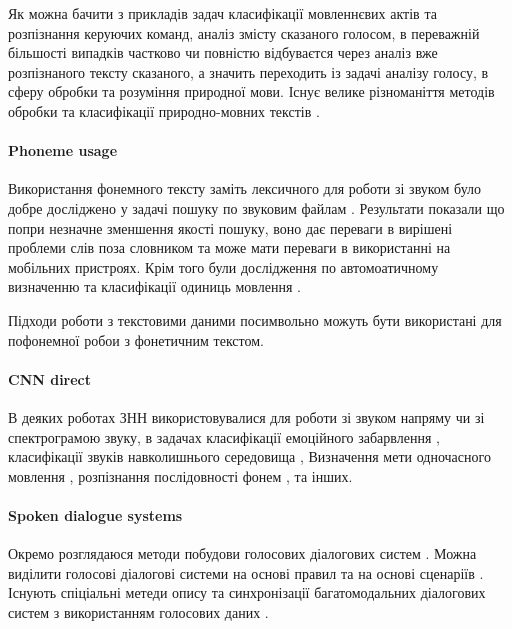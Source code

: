 Як можна бачити з прикладів задач класифікації мовленнєвих актів та розпізнання керуючих команд, аналіз змісту сказаного голосом, в переважній більшості випадків частково чи повністю відбуваєтся через аналіз вже розпізнаного тексту сказаного, а значить переходить із задачі аналізу голосу, в сферу обробки та розуміння природної мови. Існує велике різноманіття методів обробки та класифікації природно-мовних текстів \cite{Mironczuk_2018,Altinel_2018,Hartmann_2018,Kim_2014,Britz_2015_2,Britz_2015,Marchenko_2005}.

\paragraph{Phoneme usage}

Використання фонемного тексту заміть лексичного для роботи зі звуком було добре досліджено у задачі пошуку по звуковим файлам \cite{Ng_C_2000,Ng_K_2000,Witbrock_1997}. Результати показали що попри незначне зменшення якості пошуку, воно дає переваги в вирішені проблеми слів поза словником та може мати переваги в використанні на мобільних пристроях. Крім того були дослідження по автомоатичному визначенню та класифікації одиниць мовлення \cite{Sharma_2018}.

Підходи роботи з текстовими даними посимвольно \cite{Kim_2016,Zhang_2015_2,Zhang_2015,Santos_2014} можуть бути використані для пофонемної робои з фонетичним текстом.

\paragraph{CNN direct}

В деяких роботах ЗНН використовувалися для роботи зі звуком напряму чи зі спектрограмою звуку, в задачах класифікації емоційного забарвлення \cite{Weisskirchen_2017}, класифікації звуків навколишнього середовища \cite{Boddapati_2017}, Визначення мети одночасного мовлення \cite{Chowdhury_2018}, розпізнання послідовності фонем \cite{Abdel_2012,Zhang_2017}, та інших.

\paragraph{Spoken dialogue systems}

Окремо розглядаюся методи побудови голосових діалогових систем \cite{Iosif_2018}. Можна виділити голосові діалогові системи на основі правил \cite{Herbert_2018,Lopes_2015} та на основі сценаріїв \cite{Lopez_2016,Khouzaimi_2018}. Існують спіціальні метеди опису та синхронізації багатомодальних діалогових систем з використанням голосових даних \cite{Katsurada_2003,Karpov_2012}. 

